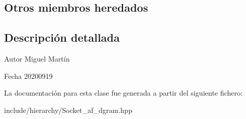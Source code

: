 \subsection*{Otros miembros heredados}


\subsection{Descripción detallada}
\begin{DoxyAuthor}{Autor}
Miguel Martín 
\end{DoxyAuthor}
\begin{DoxyDate}{Fecha}
20200919 
\end{DoxyDate}


La documentación para esta clase fue generada a partir del siguiente fichero\+:\begin{DoxyCompactItemize}
\item 
include/hierarchy/Socket\+\_\+af\+\_\+dgram.\+hpp\end{DoxyCompactItemize}
